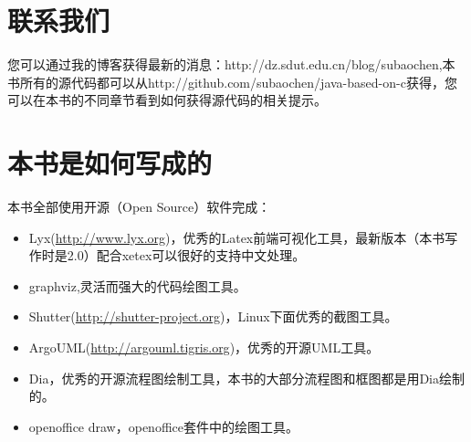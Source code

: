 \section*{联系我们}
您可以通过我的博客获得最新的消息：http://dz.sdut.edu.cn/blog/subaochen,本书所有的源代码都可以从http://github.com/subaochen/java-based-on-c获得，您可以在本书的不同章节看到如何获得源代码的相关提示。

\section*{本书是如何写成的}
本书全部使用开源（Open Source）软件完成：
\begin{itemize}
    \item Lyx(\url{http://www.lyx.org})，优秀的Latex前端可视化工具，最新版本（本书写作时是2.0）配合xetex可以很好的支持中文处理。
    \item graphviz,灵活而强大的代码绘图工具。
    \item Shutter(\url{http://shutter-project.org})，Linux下面优秀的截图工具。
    \item ArgoUML(\url{http://argouml.tigris.org})，优秀的开源UML工具。
    \item Dia，优秀的开源流程图绘制工具，本书的大部分流程图和框图都是用Dia绘制的。
    \item openoffice draw，openoffice套件中的绘图工具。
\end{itemize}
\mainmatter
